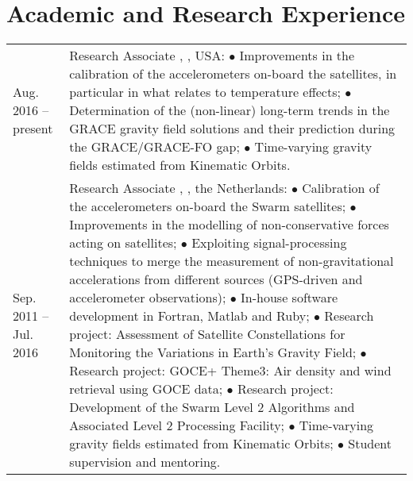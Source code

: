 \documentclass[a4paper]{article}
\newcommand{\dynhref}[2]{%
  \iftoggle{expliciturl}{%
    #2 (\href{#1}{\texttt{\detokenize{#1}}})%
  }{%
    \href{#1}{#2}%
  }%
}
\newlength{\listskipbig}
\newenvironment{cvsection}[2]{
  \setlength{\floatsep}{0pt}
  \setlength{\textfloatsep}{0pt}
  \setlength{\intextsep}{0pt}
  \section*{#1}
  \begin{longtable}{lp{#2}}
}{
  \end{longtable}
}
\begin{document}

\begin{cvsection}{Academic and Research Experience}{10.8cm}

Aug. 2016 -- present
  & Research Associate\newline
    \dynhref{http://www.csr.utexas.edu}{Center for Space Research}, \dynhref{http://www.utexas.edu}{Texas University at Austin}, USA:\newline
    $\bullet$ Improvements in the calibration of the accelerometers on-board the \dynhref{http://www.csr.utexas.edu/grace/}{GRACE} satellites, in particular in what relates to temperature effects;\newline
    $\bullet$ Determination of the (non-linear) long-term trends in the GRACE gravity field solutions and their prediction during the GRACE/GRACE-FO gap;\newline
    $\bullet$ Time-varying gravity fields estimated from Kinematic Orbits.
    \\[\listskipbig]

Sep. 2011 -- Jul. 2016
  & Research Associate\newline
    \dynhref{http://www.as.lr.tudelft.nl}{Astrodynamics and Space Missions}, \dynhref{http://www.tudelft.nl/}{Delft University of Technology}, the Netherlands:\newline
    $\bullet$ Calibration of the accelerometers on-board the Swarm satellites;\newline
    $\bullet$ Improvements in the modelling of non-conservative forces acting on satellites;\newline
    $\bullet$ Exploiting signal-processing techniques to merge the measurement of non-gravitational accelerations from different sources (GPS-driven and accelerometer observations);\newline
    $\bullet$ In-house software development in Fortran, Matlab and Ruby;\newline
    $\bullet$ Research project: Assessment of Satellite Constellations for Monitoring the Variations in Earth's Gravity Field;\newline
    $\bullet$ Research project: GOCE+ Theme3: Air density and wind retrieval using GOCE data;\newline
    $\bullet$ Research project: Development of the Swarm Level 2 Algorithms and Associated Level 2 Processing Facility;\newline
    $\bullet$ Time-varying gravity fields estimated from Kinematic Orbits;\newline
    $\bullet$ Student supervision and mentoring.
    \\[\listskipbig]


\end{cvsection}
\end{document}
